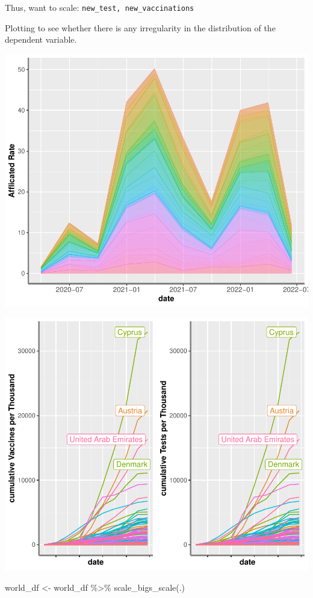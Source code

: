 \documentclass[11pt,preprint, authoryear]{elsarticle}
\numberwithin{equation}{section}
\numberwithin{figure}{section}
\numberwithin{table}{section}
\newenvironment{Shaded}{\begin{snugshade}}{\end{snugshade}}
\newcommand{\FunctionTok}[1]{\textcolor[rgb]{0.00,0.00,0.00}{#1}}
\newcommand{\NormalTok}[1]{#1}
\newcommand{\OtherTok}[1]{\textcolor[rgb]{0.56,0.35,0.01}{#1}}
\newcommand{\SpecialCharTok}[1]{\textcolor[rgb]{0.00,0.00,0.00}{#1}}
\begin{document}
Thus, want to scale: \texttt{new\_test,\ new\_vaccinations}

Plotting to see whether there is any irregularity in the distribution of
the dependent variable.

\includegraphics{Cross_Section_Assignment_files/figure-latex/afflicted-1.pdf}

\includegraphics{Cross_Section_Assignment_files/figure-latex/var_plot-1.pdf}

\begin{Shaded}
\begin{Highlighting}[]
\NormalTok{world\_df }\OtherTok{\textless{}{-}}\NormalTok{ world\_df }\SpecialCharTok{\%\textgreater{}\%} \FunctionTok{scale\_bigs\_scale}\NormalTok{(.)}
\end{Highlighting}
\end{Shaded}
\end{document}
